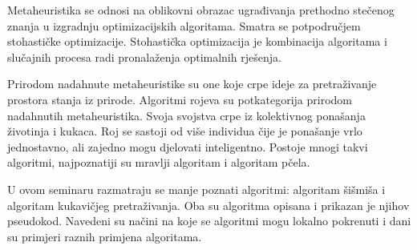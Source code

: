 \hspace{\parindent} Metaheuristika se odnosi na oblikovni obrazac ugrađivanja prethodno stečenog znanja u izgradnju optimizacijskih algoritama. Smatra se potpodručjem stohastičke optimizacije. Stohastička optimizacija je kombinacija algoritama i slučajnih procesa radi pronalaženja optimalnih rješenja. 

Prirodom nadahnute metaheuristike su one koje crpe ideje za pretraživanje prostora stanja iz prirode. Algoritmi rojeva su potkategorija prirodom nadahnutih metaheuristika. Svoja svojstva crpe iz kolektivnog ponašanja životinja i kukaca. Roj se sastoji od više individua čije je ponašanje vrlo jednostavno, ali zajedno mogu djelovati inteligentno. Postoje mnogi takvi algoritmi, najpoznatiji su mravlji algoritam i algoritam pčela. 

U ovom seminaru razmatraju se manje poznati algoritmi: algoritam šišmiša i algoritam kukavičjeg pretraživanja. Oba su algoritma opisana i prikazan je njihov pseudokod. Navedeni su načini na koje se algoritmi mogu lokalno pokrenuti i dani su primjeri raznih primjena algoritama. 